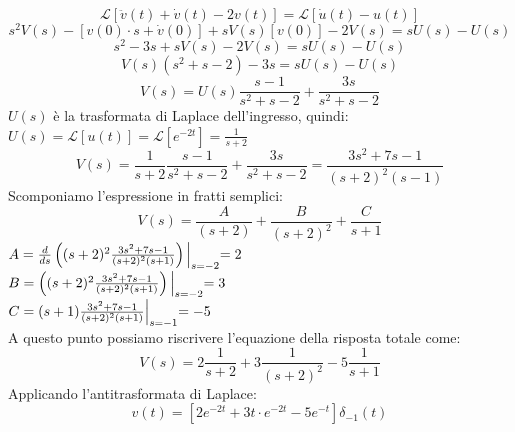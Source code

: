 \documentclass[12pt,a4paper]{article}
\begin{document}
\begin{enumerate}
		\[
			\mathcal{L}[\ddot{v}(t) + \dot{v}(t) - 2v(t)] = \mathcal{L}[\dot{u}(t)-u(t)]
		\]
		\[
			s^2V(s)-[v(0)\cdot s + \dot{v}(0)]+sV(s)[v(0)] - 2V(s)
 = sU(s) - U(s)
 		\]
 		\[
 			s^2 - 3s + sV(s) - 2V(s) = sU(s) - U(s)
 		\]
 		\[
 			V(s)(s^2+s-2) - 3s = sU(s) - U(s)
 		\]
 		\[
 			V(s) = U(s)\frac{s-1}{s^2+s-2} + \frac{3s}{s^2+s-2}
 		\]
 		$U(s)$ è la trasformata di Laplace dell'ingresso, quindi:$U(s) = \mathcal{L}[u(t)] = \mathcal{L}[e^{-2t}] = \frac{1}{s+2}$
 		\[
 			V(s) = \frac{1}{s+2}\frac{s-1}{s^2+s-2} + \frac{3s}{s^2+s-2} = \frac{3s^2+7s-1}{(s+2)^2(s-1)}
 		\]
 		Scomponiamo l'espressione in fratti semplici:
 		\[
 			V(s) = \frac{A}{(s+2)} + \frac{B}{(s+2)^2} + \frac{C}{s+1}
 		\]
 		$A = \frac{d}{ds}\left((s+2)^2\frac{3s^2 + 7s - 1}{(s+2)^2(s+1)}\right)\Bigl\lvert_{s=-2} = 2$\vspace{5px}\\
		$B = \left((s+2)^2\frac{3s^2 + 7s - 1}{(s+2)^2(s+1)}\right)\Bigl\lvert_{s=-2} = 3$\vspace{5px}\\
		$C = (s+1)\frac{3s^2 + 7s - 1}{(s+2)^2(s+1)}\Bigl\lvert_{s=-1} = -5$\vspace{5px}\\
		A questo punto possiamo riscrivere l'equazione della risposta totale come:
		\[
			V(s) = 2\frac{1}{s+2} + 3\frac{1}{(s+2)^2}-5\frac{1}{s+1}
		\]
		Applicando l'antitrasformata di Laplace:
		\[
			v(t) = \left[2e^{-2t} + 3t\cdot e^{-2t} - 5e^{-t}\right]\delta_{-1}(t)
		\]
	\end{enumerate}
	\newpage
\end{document}
